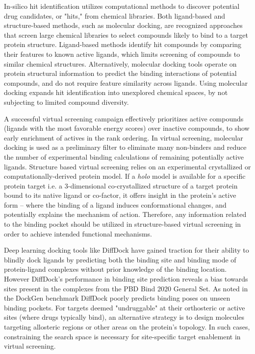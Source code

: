 \documentclass[%
 aip,
 amsmath,amssymb,
 reprint,%
]{revtex4-1}
\begin{document}
In-silico hit identification utilizes computational methods to discover potential drug candidates, or "hits," from chemical libraries. Both ligand-based and structure-based methods, such as molecular docking, are recognized approaches that screen large chemical libraries to select compounds likely to bind to a target protein structure. Ligand-based methods identify hit compounds by comparing their features to known active ligands, which limits screening of compounds to similar chemical structures. Alternatively, molecular docking tools operate on protein structural information to predict the binding interactions of potential compounds, and do not require feature similarity across ligands. Using molecular docking expands hit identification into unexplored chemical spaces, by not subjecting to limited compound diversity.

A successful virtual screening campaign effectively prioritizes active compounds (ligands with the most favorable energy scores) over inactive compounds, to show early enrichment of actives in the rank ordering. In virtual screening, molecular docking is used as a preliminary filter to eliminate many non-binders and reduce the number of experimental binding calculations of remaining potentially active ligands. Structure based virtual screening relies on an experimental crystallized or computationally-derived protein model. If a \textit{holo} model is available for a specific protein target i.e. a 3-dimensional co-crystallized structure of a target protein bound to its native ligand or co-factor, it offers insight in the protein's active form -- where the binding of a ligand induces conformational changes, and potentially explains the mechanism of action. Therefore, any information related to the binding pocket should be utilized in structure-based virtual screening in order to achieve intended functional mechanisms. 


Deep learning docking tools like DiffDock have gained traction for their ability to blindly dock ligands by predicting both the binding site and binding mode of protein-ligand complexes without prior knowledge of the binding location. However DiffDock's performance in binding site prediction reveals a bias towards sites present in the complexes from the PBD Bind 2020 General Set. As noted in the DockGen benchmark \cite{corso2024dockgen} DiffDock poorly predicts binding poses on unseen binding pockets. For targets deemed "undruggable" at their orthosteric or active sites (where drugs typically bind), an alternative strategy is to design molecules targeting allosteric regions or other areas on the protein's topology. In such cases, constraining the search space is necessary for site-specific target enablement in virtual screening.
\end{document}
